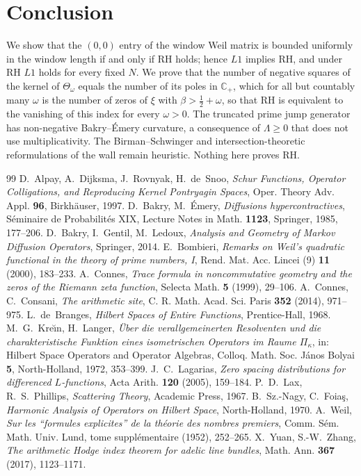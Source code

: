 \documentclass[11pt]{amsart}
\theoremstyle{definition}
\theoremstyle{remark}
\newcommand{\half}{\tfrac{1}{2}}
\newcommand{\om}{\omega}
\newcommand{\Lam}{\Lambda}
\newcommand{\C}{\mathbb{C}}
\newcommand{\Th}{\Theta}
\begin{document}
\section{Conclusion}
We show that the $(0,0)$ entry of the window Weil matrix is bounded uniformly in the window
length if and only if RH holds; hence $L1$ implies RH, and under RH $L1$ holds for every fixed
$N$. We prove that the number of negative squares of the kernel of
$\Th_\om$ equals the number of its poles in $\C_+$, which for all but countably many $\om$ is the
number of zeros of $\xi$ with $\beta>\half+\om$, so that RH is equivalent to the vanishing of this
index for every $\om>0$. The truncated prime jump generator has non-negative Bakry--\'Emery
curvature, a consequence of $\Lam\ge0$ that does not use multiplicativity. The Birman--Schwinger
and intersection-theoretic reformulations of the wall remain heuristic. Nothing here proves RH.

\begin{thebibliography}{99}
 D.~Alpay, A.~Dijksma, J.~Rovnyak, H.~de~Snoo, \emph{Schur Functions, Operator
Colligations, and Reproducing Kernel Pontryagin Spaces}, Oper. Theory Adv. Appl. \textbf{96},
Birkh\"auser, 1997.
 D.~Bakry, M.~\'Emery, \emph{Diffusions hypercontractives}, S\'eminaire de
Probabilit\'es XIX, Lecture Notes in Math. \textbf{1123}, Springer, 1985, 177--206.
 D.~Bakry, I.~Gentil, M.~Ledoux, \emph{Analysis and Geometry of Markov Diffusion
Operators}, Springer, 2014.
 E.~Bombieri, \emph{Remarks on Weil's quadratic functional in the theory of
prime numbers, I}, Rend. Mat. Acc. Lincei (9) \textbf{11} (2000), 183--233.
 A.~Connes, \emph{Trace formula in noncommutative geometry and the zeros of the
Riemann zeta function}, Selecta Math. \textbf{5} (1999), 29--106.
 A.~Connes, C.~Consani, \emph{The arithmetic site}, C. R. Math. Acad. Sci. Paris
\textbf{352} (2014), 971--975.
 L.~de~Branges, \emph{Hilbert Spaces of Entire Functions}, Prentice-Hall, 1968.
 M.~G.~Kre\u\i n, H.~Langer, \emph{\"Uber die verallgemeinerten Resolventen und
die charakteristische Funktion eines isometrischen Operators im Raume $\Pi_\kappa$}, in: Hilbert
Space Operators and Operator Algebras, Colloq. Math. Soc. J\'anos Bolyai \textbf{5}, North-Holland,
1972, 353--399.
 J.~C.~Lagarias, \emph{Zero spacing distributions for differenced
$L$-functions}, Acta Arith. \textbf{120} (2005), 159--184.
 P.~D.~Lax, R.~S.~Phillips, \emph{Scattering Theory}, Academic Press, 1967.
 B.~Sz.-Nagy, C.~Foia\c s, \emph{Harmonic Analysis of Operators on Hilbert Space},
North-Holland, 1970.
 A.~Weil, \emph{Sur les ``formules explicites'' de la th\'eorie des nombres
premiers}, Comm. S\'em. Math. Univ. Lund, tome suppl\'ementaire (1952), 252--265.
 X.~Yuan, S.-W.~Zhang, \emph{The arithmetic Hodge index theorem for adelic line
bundles}, Math. Ann. \textbf{367} (2017), 1123--1171.
\end{thebibliography}
\end{document}
